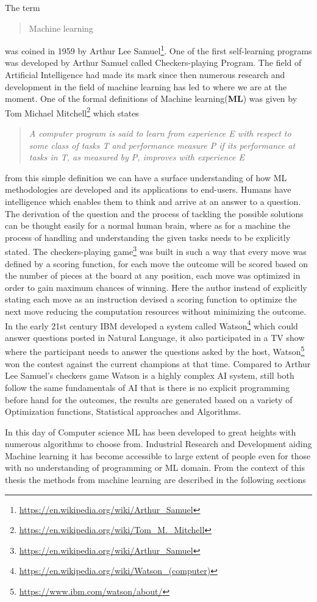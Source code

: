 The term \blockquote{Machine learning} was coined in 1959 by Arthur Lee Samuel\footnote{\url{https://en.wikipedia.org/wiki/Arthur_Samuel}}. One of the first self-learning programs was developed by Arthur Samuel called Checkers-playing Program. The field of Artificial Intelligence had made its mark since then numerous research and development in the field of machine learning has led to where we are at the moment. One of the formal definitions of Machine learning(\textbf{ML}) was given by Tom Michael Mitchell\footnote{\url{https://en.wikipedia.org/wiki/Tom_M._Mitchell}} which states \blockquote{\textit{A computer program is said to learn from experience E with respect to some class of tasks T and performance measure P if its performance at tasks in T, as measured by P, improves with experience E}} from this simple definition we can have a surface understanding of how ML methodologies are developed and its applications to end-users. Humans have intelligence which enables them to think and arrive at an answer to a question. The derivation of the question and the process of tackling the possible solutions can be thought easily for a normal human brain, where as for a machine the process of handling and understanding the given tasks needs to be explicitly stated. The checkers-playing game\footnote{\url{https://en.wikipedia.org/wiki/Arthur_Samuel}} was built in such a way that every move was defined by a scoring function, for each move the outcome will be scored based on the number of pieces at the board at any position, each move was optimized in order to gain maximum chances of winning. Here the author instead of explicitly stating each move as an instruction devised a scoring function to optimize the next move reducing the computation resources without minimizing the outcome. In the early 21st century IBM developed a system called Watson\footnote{\url{https://en.wikipedia.org/wiki/Watson_(computer)}} which could answer questions posted in Natural Language, it also participated in a TV show where the participant needs to answer the questions 
asked by the host, Watson\footnote{\url{https://www.ibm.com/watson/about/}} won the contest against the current champions at that time. Compared to Arthur Lee Samuel's checkers game Watson is a highly complex AI system, still both follow the same fundamentals of AI that is there is no explicit programming before hand for the outcomes, the results are generated based on a variety of Optimization functions, Statistical approaches and Algorithms. 

In this day of Computer science ML has been developed to great heights with numerous algorithms to choose from. Industrial Research and Development aiding Machine learning it has become accessible to large extent of people even for those with no understanding of programming or ML domain. From the context of this thesis the methods from machine learning are described in the following sections

